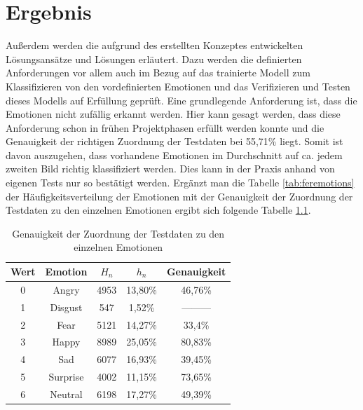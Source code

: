 \documentclass[12pt, a4paper]{report}
\begin{document}
\chapter{Ergebnis}
Außerdem werden die aufgrund des erstellten Konzeptes entwickelten Lösungsansätze und Lösungen erläutert. Dazu werden die definierten Anforderungen vor allem auch im Bezug auf das trainierte Modell zum Klassifizieren von den vordefinierten Emotionen und das Verifizieren und Testen dieses Modells auf Erfüllung geprüft.\newline
Eine grundlegende Anforderung ist, dass die Emotionen nicht zufällig erkannt werden. Hier kann gesagt werden, dass diese Anforderung schon in frühen Projektphasen erfüllt werden konnte und die Genauigkeit der richtigen Zuordnung der Testdaten bei 55,71\% liegt. Somit ist davon auszugehen, dass vorhandene Emotionen im Durchschnitt auf ca. jedem zweiten Bild richtig klassifiziert werden. Dies kann in der Praxis anhand von eigenen Tests nur so bestätigt werden. Ergänzt man die Tabelle \ref{tab:feremotions} der Häufigkeitsverteilung der Emotionen mit der Genauigkeit der Zuordnung der Testdaten zu den einzelnen Emotionen ergibt sich folgende Tabelle \ref{tab:genauigkeitemotions}.
\begin{table}[h]
  \centering
  \begin{tabular}[t]{c|c|c|c|c}
  Wert & Emotion & $H_n$ & $h_n$ & Genauigkeit \\
  \hline
  0 & Angry & 4953 & 13,80\% & 46,76\% \\
  1 & Disgust & 547 & 1,52\% & --------- \\
  2 & Fear & 5121 & 14,27\% & 33,4\% \\
  3 & Happy & 8989 & 25,05\% & 80,83\% \\
  4 & Sad & 6077 & 16,93\% & 39,45\% \\
  5 & Surprise & 4002 & 11,15\% & 73,65\% \\
  6 & Neutral & 6198 & 17,27\% & 49,39\% \\
  \hline
  \end{tabular}
  \caption{Genauigkeit der Zuordnung der Testdaten zu den einzelnen Emotionen}
  \label{tab:genauigkeitemotions}
\end{table} 
\end{document}
